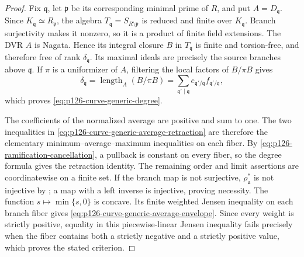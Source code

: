\begin{proof}
Fix \(\mathfrak q\), let \(\mathfrak p\) be its corresponding minimal prime
of \(R\), and put \(A=D_{\mathfrak q}\).  Since
\(K_{\mathfrak q}\simeq R_{\mathfrak p}\), the algebra
\(T_{\mathfrak q}=S_{R\setminus\mathfrak p}\) is reduced and finite over
\(K_{\mathfrak q}\).  Branch surjectivity makes it nonzero, so it is a
product of finite field extensions.  The DVR \(A\) is Nagata.  Hence its
integral closure \(B\) in \(T_{\mathfrak q}\) is finite and torsion-free,
and therefore free of rank \(\delta_{\mathfrak q}\).  Its maximal ideals
are precisely the source branches above \(\mathfrak q\).  If \(\pi\) is a
uniformizer of \(A\), filtering the local factors of \(B/\pi B\) gives
\[
 \delta_{\mathfrak q}=\operatorname{length}_A(B/\pi B)
   =\sum_{\mathfrak q'\mid\mathfrak q}
      e_{\mathfrak q'/\mathfrak q}
      f_{\mathfrak q'/\mathfrak q},
\]
which proves \eqref{eq:p126-curve-generic-degree}.

The coefficients of the normalized average are positive and sum to one.
The two inequalities in
\eqref{eq:p126-curve-generic-average-retraction} are therefore the elementary
minimum--average--maximum inequalities on each fiber.  By
\eqref{eq:p126-ramification-cancellation}, a pullback is constant on every
fiber, so the degree formula gives the retraction identity.  The remaining
order and limit assertions are coordinatewise on a finite set.  If the
branch map is not surjective, \(\rho_{\mathfrak a}^*\) is not injective by
; a map with a left inverse is
injective, proving necessity.  The function \(s\mapsto\min\{s,0\}\) is
concave.  Its finite weighted Jensen inequality on each branch fiber gives
\eqref{eq:p126-curve-generic-average-envelope}.  Since every weight is
strictly positive, equality in this piecewise-linear Jensen inequality fails
precisely when the fiber contains both a strictly negative and a strictly
positive value, which proves the stated criterion.


\end{proof}
